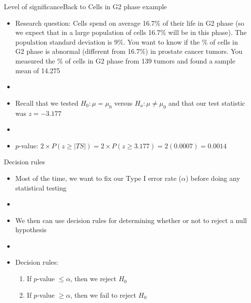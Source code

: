 \documentclass[xcolor=dvipsnames]{beamer}
\begin{document}
\begin{frame}{Level of significance}{Back to Cells in G2 phase example}
		\begin{itemize}
		\item Research question: Cells spend on average 16.7\% of their life in G2 phase (so we expect that in a large population of cells 16.7\% will be in this phase). The population standard deviation is 9\%. You want to know if the \% of cells in G2 phase is abnormal (different from 16.7\%) in prostate cancer tumors. You measured the \% of cells in G2 phase from 139 tumors and found a sample mean of 14.275  \pause
		
		\item[]
		
		\item Recall that we tested $H_0: \mu = \mu_0$ versus $H_a: \mu \neq \mu_0$ and that our test statistic was $z = -3.177$  \pause
		
		\item[]
		
		\item $p$-value: $2\times P(z \geq |TS|) = 2 \times P(z \geq 3.177) = 2 (0.0007) = 0.0014$ 
	\end{itemize}
\end{frame}

\begin{frame}{Decision rules}
	\begin{itemize}
		\item Most of the time, we want to fix our Type I error rate ($\alpha$) before doing any statistical testing  \pause
		
		\item[]
		
		\item We then can use decision rules for determining whether or not to reject a null hypothesis  \pause
		
		\item[]
		
		\item Decision rules:  \pause
		\begin{enumerate}
			\item If $p$-value $\leq \alpha$, then we reject $H_0$  \pause
			\item If $p$-value $\geq \alpha$, then we fail to reject $H_0$
		\end{enumerate}
	\end{itemize}
\end{frame}
\end{document}
